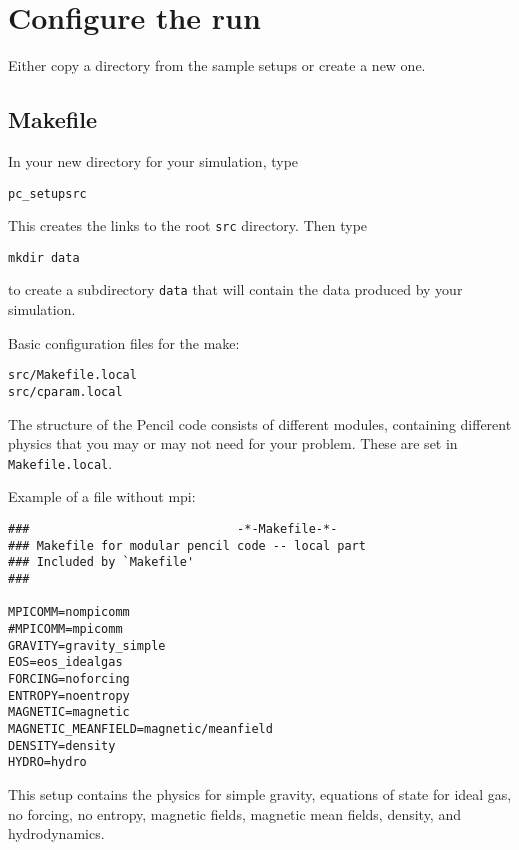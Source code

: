 \documentclass[a4paper,12pt]{article}
\begin{document}
\section{Configure the run}

Either copy a directory from the sample setups or create a new one.


\subsection{Makefile}
In your new directory for your simulation, type
\begin{verbatim}
pc_setupsrc
\end{verbatim}
This creates the links to the root \verb|src| directory. Then type 
\begin{verbatim}
mkdir data
\end{verbatim}
to create a subdirectory \verb|data| that will contain the data produced by your simulation.


Basic configuration files for the make:
\begin{verbatim}
src/Makefile.local
src/cparam.local
\end{verbatim}

The structure of the Pencil code consists of different modules, containing
different physics that you may or may not need for your problem. These are set
in \verb|Makefile.local|. 

Example of a file without mpi:
\begin{verbatim}
###                             -*-Makefile-*-
### Makefile for modular pencil code -- local part
### Included by `Makefile'
###

MPICOMM=nompicomm
#MPICOMM=mpicomm
GRAVITY=gravity_simple
EOS=eos_idealgas
FORCING=noforcing
ENTROPY=noentropy
MAGNETIC=magnetic
MAGNETIC_MEANFIELD=magnetic/meanfield
DENSITY=density
HYDRO=hydro
\end{verbatim}

This setup contains the physics for simple gravity, equations of state 
for ideal gas, no forcing, no entropy, magnetic fields, magnetic mean fields,
density, and hydrodynamics.
\end{document}
